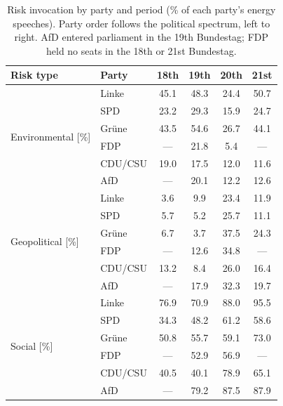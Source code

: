 \begin{table}[H]
    \centering
    \begin{tabular}{llcccc}
        \toprule
        Risk type & Party & 18th & 19th & 20th & 21st \\
        \midrule
        \multirow{6}{*}{Environmental [\%]}
        & Linke     & 45.1 & 48.3 & 24.4 & 50.7 \\
        & SPD     & 23.2 & 29.3 & 15.9 & 24.7 \\
        & Gr\"{u}ne     & 43.5 & 54.6 & 26.7 & 44.1 \\
        & FDP     & --- & 21.8 & 5.4 & --- \\
        & CDU/CSU     & 19.0 & 17.5 & 12.0 & 11.6 \\
        & AfD     & --- & 20.1 & 12.2 & 12.6 \\
        \midrule
        \multirow{6}{*}{Geopolitical [\%]}
        & Linke     & 3.6 & 9.9 & 23.4 & 11.9 \\
        & SPD     & 5.7 & 5.2 & 25.7 & 11.1 \\
        & Gr\"{u}ne     & 6.7 & 3.7 & 37.5 & 24.3 \\
        & FDP     & --- & 12.6 & 34.8 & --- \\
        & CDU/CSU     & 13.2 & 8.4 & 26.0 & 16.4 \\
        & AfD     & --- & 17.9 & 32.3 & 19.7 \\
        \midrule
        \multirow{6}{*}{Social [\%]}
        & Linke     & 76.9 & 70.9 & 88.0 & 95.5 \\
        & SPD     & 34.3 & 48.2 & 61.2 & 58.6 \\
        & Gr\"{u}ne     & 50.8 & 55.7 & 59.1 & 73.0 \\
        & FDP     & --- & 52.9 & 56.9 & --- \\
        & CDU/CSU     & 40.5 & 40.1 & 78.9 & 65.1 \\
        & AfD     & --- & 79.2 & 87.5 & 87.9 \\
        
        \bottomrule
    \end{tabular}
    \caption{Risk invocation by party and period
    (\% of each party's energy speeches). Party order follows the
    political spectrum, left to right. AfD entered parliament in the
    19th Bundestag; FDP held no seats in the 18th or 21st Bundestag.}
    \label{tab:risk_party}
\end{table}
